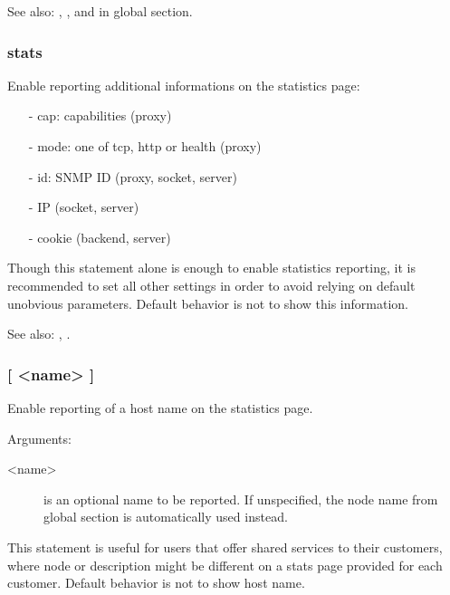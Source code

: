 See also: , ,  and  in
            global section.

\subsubsection[show-legends]{stats }



  Enable reporting additional informations on the statistics page:
  \begin{itemize}
  \item[-] cap: capabilities (proxy)
  \item[-] mode: one of tcp, http or health (proxy)
  \item[-] id: SNMP ID (proxy, socket, server)
  \item[-] IP (socket, server)
  \item[-] cookie (backend, server)
  \end{itemize}

  Though this statement alone is enough to enable statistics reporting, it is
  recommended to set all other settings in order to avoid relying on default
  unobvious parameters.  Default behavior is not to show this information.


See also: , .


\subsubsection[stats show-node]{ [ <name> ]}

  Enable reporting of a host name on the statistics page.


  Arguments:
  \begin{description}
  \item[<name>] is an optional name to be reported. If unspecified, the
              node name from global section is automatically used instead.
  \end{description}

  This statement is useful for users that offer shared services to their
  customers, where node or description might be different on a stats page
  provided for each customer.  Default behavior is not to show host name.

